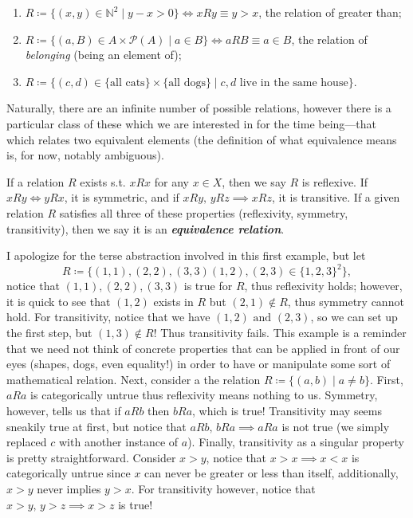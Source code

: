 \documentclass{report}
\begin{document}
\begin{enumerate}
\item \(R \coloneqq \{(x,y)\in \mathbb{N}^2 \mid y-x>0\} \iff xRy  \equiv y>x\), the relation of greater than;
\item \(R\coloneqq \{ (a,B) \in A \times \mathcal{P}(A) \mid a \in B\} \iff aRB \equiv a \in B\), the relation of \emph{belonging} (being an element of);
\item \(R\coloneqq \{(c,d)\in \{\text{all cats}\} \times  \{\text{all dogs}\}  \mid c,d \text{ live in the same house}\}\).
\end{enumerate}

Naturally, there are an infinite number of possible relations, however there is a particular class of these which we are interested in for the time being---that which relates two equivalent elements (the definition of what equivalence means is, for now, notably ambiguous).

If a relation \(R\) exists s.t. \(xRx\) for any \(x \in  X\), then we say \(R\) is reflexive. If \(xRy \iff yRx\), it is symmetric, and if \(xRy, \,  yRz \implies xRz\), it is transitive. If a given relation \(R\) satisfies all three of these properties (reflexivity, symmetry, transitivity), then we say it is an \textbf{\emph{equivalence relation}}.



\begin{solution}
I apologize for the terse abstraction involved in this first example, but let
\[ R\coloneqq \{(1,1),(2,2),(3,3)(1,2),(2,3)\in \{1,2,3\}^2  \}  ,\]
notice that \((1,1),(2,2),(3,3)\) is true for \(R\), thus reflexivity holds; however, it is quick to see that \((1,2)\) exists in \(R\) but \((2,1)\not\in R\), thus symmetry cannot hold. For transitivity, notice that we have \((1,2) \text{ and }  (2,3)\), so we can set up the first step, but \((1,3)\not\in  R\)! Thus transitivity fails. This example is a reminder that we need not think of concrete properties that can be applied in front of our eyes (shapes, dogs, even equality!) in order to have or manipulate some sort of mathematical relation. Next, consider a the relation \(R\coloneqq \{(a,b)\mid a \neq  b\}\). First, \(aRa\) is categorically untrue thus reflexivity means nothing to us. Symmetry, however, tells us that if \(aRb\) then \(bRa\), which is true! Transitivity may seems sneakily true at first, but notice that \(aRb, \, bRa \implies aRa\) is not true (we simply replaced \(c\) with another instance of \(a\)). Finally, transitivity as a singular property is pretty straightforward. Consider \(x>y\), notice that \(x>x \implies x<x\) is categorically untrue since \(x\) can never be greater or less than itself, additionally, \(x>y\) never implies \(y>x\). For transitivity however, notice that \(x>y, \, y>z \implies x>z\) is true!
\end{solution}
\end{document}
